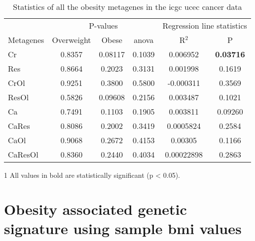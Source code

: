 \begin{appendices}
\begin{table}[htpb]
	\centering
	\caption[Statistics of all the obesity metagenes in the \gls{icgc} \acrshort{ucec} cancer data]{Statistics of all the obesity metagenes in the \gls{icgc} \gls{ucec} cancer data}
	\label{tab:degmetaucec}
	\begin{threeparttable}
		\begin{tabular}{lccccc}
			& \multicolumn{3}{c}{ P-values} & \multicolumn{2}{c}{ Regression line statistics}\\
			\cmidrule(r){2-4} \cmidrule(r){5-6}
			Metagenes &  Overweight &  Obese &  \gls{anova} &  R$^2$ &  P \\
			\hline
			\hline
			\rule{0pt}{2.25ex}Cr      & 0.8357                      & 0.08117 & 0.1039             & 0.006952   & {\bfseries 0.03716}\tnote{1}\\
			Res     & 0.8664                      & 0.2023  & 0.3131             & 0.001998   & 0.1619              \\
			CrOl    & 0.9251                      & 0.3800  & 0.5800             & -0.000311  & 0.3569              \\
			ResOl   & 0.5826                      & 0.09608 & 0.2156             & 0.003487   & 0.1021              \\
			Ca      & 0.7491                      & 0.1103  & 0.1905             & 0.003811   & 0.09260             \\
			CaRes   & 0.8086                      & 0.2002  & 0.3419             & 0.0005824  & 0.2584              \\
			CaOl    & 0.9068                      & 0.2672  & 0.4153             & 0.00305    & 0.1166              \\
			CaResOl & 0.8360                      & 0.2440  & 0.4034             & 0.00022898 & 0.2863              \\
			\hline
			\hline
		\end{tabular}
		\begin{tablenotes}
			\begin{footnotesize}
				\item [1] All values in bold are statistically significant (p \textless{} 0.05).
			\end{footnotesize}
		\end{tablenotes}
	\end{threeparttable}
\end{table}

	\section{Obesity associated genetic signature using sample \gls{bmi} values}
	\label{sec:obesity_associated_genetic_signature_using_sample_bmi_values}


\end{appendices}
